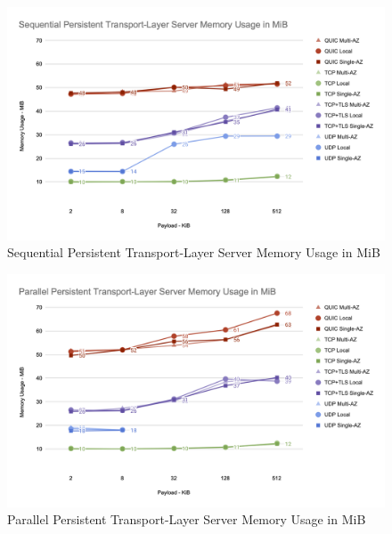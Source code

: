 \begin{figure}[h!]
    \centering
    \includegraphics[width=\linewidth]{figures/charts/Sequential Persistent Transport-Layer Server Memory Usage in MiB.png}
    \caption{Sequential Persistent Transport-Layer Server Memory Usage in MiB}
    \label{fig:sequential_server_transport_memory}
\end{figure}
\begin{figure}[h!]
    \centering
    \includegraphics[width=\linewidth]{figures/charts/Parallel Persistent Transport-Layer Server Memory Usage in MiB.png}
    \caption{Parallel Persistent Transport-Layer Server Memory Usage in MiB}
    \label{fig:parallel_server_transport_memory}
\end{figure}
